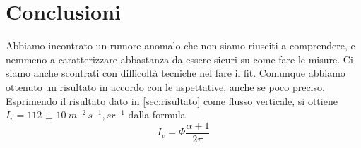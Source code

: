 \section{Conclusioni}

Abbiamo incontrato un rumore anomalo che non siamo riusciti a comprendere,
e nemmeno a caratterizzare abbastanza da essere sicuri su come fare le misure.
Ci siamo anche scontrati con difficoltà tecniche nel fare il fit.
Comunque abbiamo ottenuto un risultato in accordo con le aspettative, anche se poco preciso.
Esprimendo il risultato dato in \autoref{sec:risultato} come flusso verticale,
si ottiene $I_v=\SI{112(10)}{m^{-2}\,s^{-1},sr^{-1}}$ dalla formula
\begin{equation*}
	I_v = \Phi \frac{\alpha+1}{2\pi}
\end{equation*}

